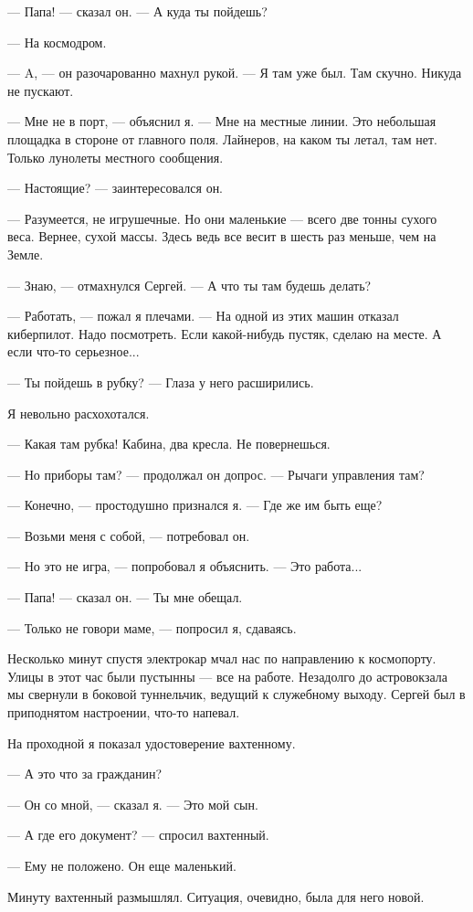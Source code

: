 \documentclass[11pt,a4paper,oneside]{article}
\begin{document}
— Папа! — сказал он. — А куда ты пойдешь?

— На космодром.

— A, — он разочарованно махнул рукой. — Я там уже был. Там скучно. Никуда не пускают.

— Мне не в порт, — объяснил я. — Мне на местные линии. Это небольшая площадка в стороне от главного поля. Лайнеров, на каком ты летал, там нет. Только лунолеты местного сообщения.

— Настоящие? — заинтересовался он.

— Разумеется, не игрушечные. Но они маленькие — всего две тонны сухого веса. Вернее, сухой массы. Здесь ведь все весит в шесть раз меньше, чем на Земле.

— Знаю, — отмахнулся Сергей. — А что ты там будешь делать?

— Работать, — пожал я плечами. — На одной из этих машин отказал киберпилот. Надо посмотреть. Если какой-нибудь пустяк, сделаю на месте. А если что-то серьезное...

— Ты пойдешь в рубку? — Глаза у него расширились.

Я невольно расхохотался.

— Какая там рубка! Кабина, два кресла. Не повернешься.

— Но приборы там? — продолжал он допрос. — Рычаги управления там?

— Конечно, — простодушно признался я. — Где же им быть еще?

— Возьми меня с собой, — потребовал он.

— Но это не игра, — попробовал я объяснить. — Это работа...

— Папа! — сказал он. — Ты мне обещал.

— Только не говори маме, — попросил я, сдаваясь.

Несколько минут спустя электрокар мчал нас по направлению к космопорту. Улицы в этот час были пустынны — все на работе. Незадолго до астровокзала мы свернули в боковой туннельчик, ведущий к служебному выходу. Сергей был в приподнятом настроении, что-то напевал.

На проходной я показал удостоверение вахтенному.

— А это что за гражданин?

— Он со мной, — сказал я. — Это мой сын.

— А где его документ? — спросил вахтенный.

— Ему не положено. Он еще маленький.

Минуту вахтенный размышлял. Ситуация, очевидно, была для него новой.
\end{document}
